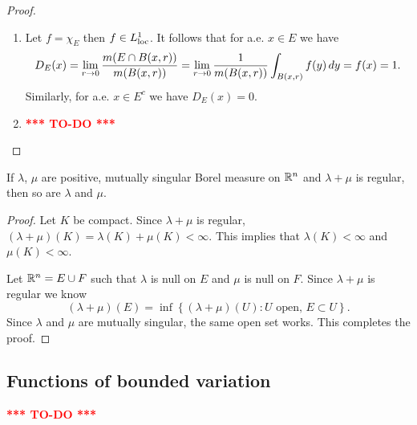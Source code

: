 \documentclass[a4paper]{article}
\newcommand{\TODO}{\textcolor{red}{\textbf{*** TO-DO ***}}}
\begin{document}
\begin{proof}
\begin{enumerate}
\item Let $f = \chi_E$ then $f \in L^1_{\mathrm{loc}}$. It follows that 
for a.e. $x \in E$ we have 
\[
D_E (x)
= \lim_{r \to 0} \frac{m (E \cap B(x, r))}{ m (B(x, r)) } 
= \lim_{r \to 0} \frac{1}{ m (B(x, r)) } \int_{B(x, r)} f(y) \, d y
= f(x) = 1. 
\]
Similarly, for a.e. $x \in E^c$ we have $D_E(x) = 0$.

\item \TODO
\end{enumerate}
\end{proof} 

\begin{ex}[Folland 3.26]
If $\lambda$, $\mu$ are positive, mutually singular Borel measure on 
$\mathbb{R}^n$ and $\lambda + \mu$ is regular, then so are $\lambda$ and $\mu$.
\end{ex}

\begin{proof}
Let $K$ be compact. Since $\lambda + \mu$ is regular, 
$(\lambda + \mu)(K) = \lambda (K) + \mu(K) < \infty$. This implies that 
$\lambda (K) < \infty$ and $\mu (K) < \infty$.

Let $\mathbb{R}^n = E \cup F$ such that $\lambda$ is null on $E$ and 
$\mu$ is null on $F$. Since $\lambda + \mu$ is regular we know 
\[
(\lambda + \mu) (E) = \inf \left\{ (\lambda + \mu)(U) : 
\text{$U$ open, $E \subset U$} \right\}.
\]
Since $\lambda$ and $\mu$ are mutually singular, the same open set 
works. This completes the proof.
\end{proof}

\subsection{Functions of bounded variation}
\TODO
\end{document}
